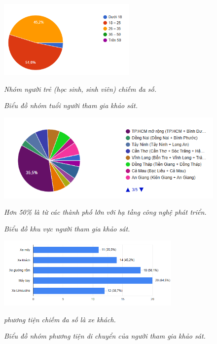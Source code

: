 \begin{center}
    

\begin{figure}[h]
    \centering
    \includegraphics[width=0.6\textwidth]{assets/chart/1.4.1.png}
    \caption{\textit{Biểu đồ nhóm tuổi người tham gia khảo sát.}} \textit{Nhóm người trẻ (học sinh, sinh viên) chiếm đa số.}
    \label{fig:nhom_tuoi}
\end{figure}

\begin{figure}[h]
    \centering
    \includegraphics[width=1\textwidth]{assets/chart/1.4.2.png}
    \caption{\textit{Biểu đồ khu vực người tham gia khảo sát.}} \textit{Hơn 50\% là từ các thành phố lớn với hạ tầng công nghệ phát triển.}
    \label{fig:khu_vuc}
\end{figure}

\begin{figure}[h]
    \centering
    \includegraphics[width=0.8\textwidth]{assets/chart/1.4.3.png}
    \caption{\textit{Biểu đồ nhóm phương tiện di chuyển của người tham gia khảo sát.}} \textit{phương tiện chiếm đa số là xe khách.}
    \label{fig:nhom_phuong_tien}
\end{figure}


\end{center}

